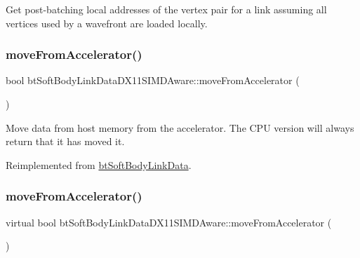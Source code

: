 Get post-\/batching local addresses of the vertex pair for a link assuming all vertices used by a wavefront are loaded locally. \mbox{\label{classbtSoftBodyLinkDataDX11SIMDAware_a86ffcd3e1eae29d3a9019790d4172990}} 
\subsubsection{\texorpdfstring{move\+From\+Accelerator()}{moveFromAccelerator()}\hspace{0.1cm}{\footnotesize\ttfamily [1/2]}}
{\footnotesize\ttfamily bool bt\+Soft\+Body\+Link\+Data\+D\+X11\+S\+I\+M\+D\+Aware\+::move\+From\+Accelerator (\begin{DoxyParamCaption}{ }\end{DoxyParamCaption})\hspace{0.3cm}{\ttfamily [virtual]}}

Move data from host memory from the accelerator. The C\+PU version will always return that it has moved it. 

Reimplemented from \hyperlink{classbtSoftBodyLinkData_a5018ad236aae590df94bca63c1ad7ee1}{bt\+Soft\+Body\+Link\+Data}.

\mbox{\label{classbtSoftBodyLinkDataDX11SIMDAware_a939884d3e31eb6599b71e466e96f9fc9}} 
\subsubsection{\texorpdfstring{move\+From\+Accelerator()}{moveFromAccelerator()}\hspace{0.1cm}{\footnotesize\ttfamily [2/2]}}
{\footnotesize\ttfamily virtual bool bt\+Soft\+Body\+Link\+Data\+D\+X11\+S\+I\+M\+D\+Aware\+::move\+From\+Accelerator (\begin{DoxyParamCaption}{ }\end{DoxyParamCaption})\hspace{0.3cm}{\ttfamily [virtual]}}

